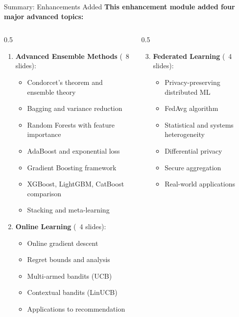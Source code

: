 
\begin{frame}{Summary: Enhancements Added}
\textbf{This enhancement module added four major advanced topics:}

\begin{columns}
\begin{column}{0.5\textwidth}
\begin{enumerate}
\item \textbf{Advanced Ensemble Methods} (~8 slides):
   \begin{itemize}
   \item Condorcet's theorem and ensemble theory
   \item Bagging and variance reduction
   \item Random Forests with feature importance
   \item AdaBoost and exponential loss
   \item Gradient Boosting framework
   \item XGBoost, LightGBM, CatBoost comparison
   \item Stacking and meta-learning
   \end{itemize}

\item \textbf{Online Learning} (~4 slides):
   \begin{itemize}
   \item Online gradient descent
   \item Regret bounds and analysis
   \item Multi-armed bandits (UCB)
   \item Contextual bandits (LinUCB)
   \item Applications to recommendation
   \end{itemize}
\end{enumerate}
\end{column}
\begin{column}{0.5\textwidth}
\begin{enumerate}
\setcounter{enumi}{2}
\item \textbf{Federated Learning} (~4 slides):
   \begin{itemize}
   \item Privacy-preserving distributed ML
   \item FedAvg algorithm
   \item Statistical and systems heterogeneity
   \item Differential privacy
   \item Secure aggregation
   \item Real-world applications
   \end{itemize}


\end{enumerate}
\end{column}
\end{columns}
\end{frame}
